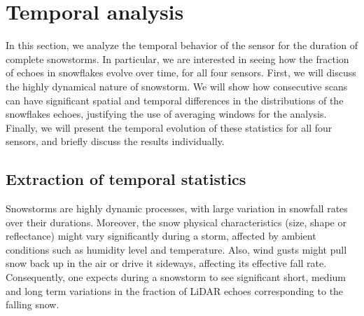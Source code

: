 



\section{Temporal analysis}
\label{sec:temporal}

In this section, we analyze the temporal behavior of the sensor for the duration of complete snowstorms. In particular, we are interested in seeing how the fraction of echoes in snowflakes evolve over time, for all four sensors. First, we will discuss the highly dynamical nature of snowstorm. We will show how consecutive scans can have significant spatial and temporal differences in the distributions of the snowflakes echoes, justifying the use of averaging windows for the analysis. Finally, we will present the temporal evolution of these statistics for all four sensors, and briefly discuss the results individually.

\subsection{Extraction of temporal statistics}

Snowstorms are highly dynamic processes, with large variation in snowfall rates over their durations. Moreover, the snow physical characteristics (size, shape or reflectance) might vary significantly during a storm, affected by ambient conditions such as humidity level and temperature. Also, wind gusts might pull snow back up in the air or drive it sideways, affecting its effective fall rate. Consequently, one expects during a snowstorm to see significant short, medium and long term variations in the fraction of LiDAR echoes corresponding to the falling snow. 

